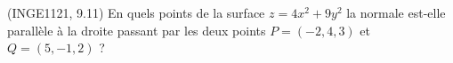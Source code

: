 
\begin{exercice}\label{exoDerrivePartielle-0002}

	(INGE1121, 9.11) En quels points de la surface $z=4x^2+9y^2$ la normale est-elle parallèle à la droite passant par les deux points $P=(-2,4,3)$ et $Q=(5,-1,2)$ ?

\end{exercice}
